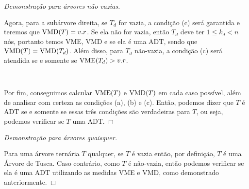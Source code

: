 \begin{proof}[Demonstração para árvores não-vazias]
    ~

    Agora, para a subárvore direita, se $T_d$ for vazia, a condição (c) será garantida e teremos que $\operatorname{VMD}(T) = v.r$. Se ela não for vazia, então $T_d$ deve ter $1 \leq k_d < n$ nós, portanto temos VME, VMD e se ela é uma ADT, sendo que $\operatorname{VMD}(T) = \operatorname{VMD}(T_d)$. Além disso, para $T_d$ não-vazia, a condição (c) será atendida se e somente se $\operatorname{VME}(T_d) > v.r$.

    ~

    Por fim, conseguimos calcular $\operatorname{VME}(T)$ e $\operatorname{VMD}(T)$ em cada caso possível, além de analisar com certeza as condições (a), (b) e (c). Então, podemos dizer que $T$ é ADT se e somente se essas três condições são verdadeiras para $T$, ou seja, podemos verificar se $T$ uma ADT.
\end{proof}

\itemsep

\begin{proof}[Demonstração para árvores quaisquer]~

    Para uma árvore ternária $T$ qualquer, se $T$ é vazia então, por definição, $T$ é uma Árvore de Tusca. Caso contrário, como $T$ é não-vazia, então podemos verificar se ela é uma ADT utilizando as medidas VME e VMD, como demonstrado anteriormente.
\end{proof}
